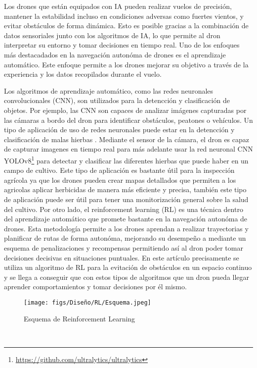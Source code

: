 Los drones que están equipados con IA pueden realizar vuelos de precisión, mantener la estabilidad incluso en condiciones adversas como fuertes vientos, y evitar obstáculos 
de forma dinámica. Esto es posible gracias a la combinación de datos sensoriales junto con los algoritmos de IA, lo que permite 
al dron interpretar su entorno y tomar decisiones en tiempo real.\newline 
Uno de los enfoques más destacadados en la navegación autonóma de drones es el aprendizaje automático. Este enfoque permite a los drones mejorar su objetivo a través de la experiencia 
y los datos recopilados durante el vuelo. \newline

Los algoritmos de aprendizaje automático, como las redes neuronales convolucionales (CNN), son utilizados para la detencción y clasificación
de objetos. Por ejemplo, las CNN son capaces de analizar imágenes capturadas por las cámaras a bordo del dron para identificar obstáculos, 
peatones o vehículos. Un tipo de aplicación de uso de redes neuronales puede estar en la detencción y clasificación de malas hierbas \cite{CSIC}. Mediante el sensor de la cámara, el dron es capaz de capturar imagenes en tiempo real 
para más adelante usar la red neuronal CNN YOLOv8\footnote{\url{https://github.com/ultralytics/ultralytics}} para detectar y clasificar las diferentes hierbas que puede haber en un campo de cultivo. Este tipo de aplicación es bastante útil para la inspección
agrícola ya que los drones pueden crear mapas detallados que permiten a los agricolas aplicar herbicidas de manera más eficiente y precisa, también este tipo de aplicación puede
ser útil para tener una monitorización general sobre la salud del cultivo. \newline 
Por otro lado, el reinforcement learning (RL) \cite{6025669} es una técnica dentro del aprendizaje automático que promete bastante en la navegación autonóma de drones. Esta metodología permite
a los drones aprendan a realizar trayectorias y planificar de rutas de forma autonóma, mejorando su desempeño a mediante un esquema de penalizaciones y recompensas permitiendo
así al dron poder tomar decisiones decisivas en situaciones puntuales. En este artículo 
\cite{ai2030023} precisamente se utiliza un algoritmo de RL para la evitación de obstáculos en un espacio continuo y se llega a conseguir que con estos
tipos de algoritmos que un dron pueda llegar aprender comportamientos y tomar decisiones por él mismo. 

\begin{figure} [H]
  \begin{center}
    \texttt{[image: figs/Diseño/RL/Esquema.jpeg]}
  \end{center}
  \caption{Esquema de Reinforcement Learning}
  \label{fig:Reinforcement Learning}
\end{figure}\



